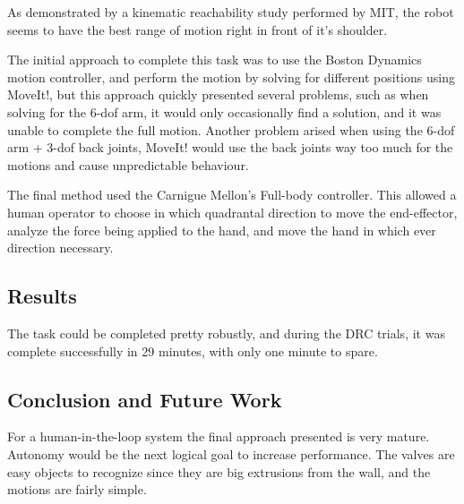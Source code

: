 \documentclass[12pt]{report}
\begin{document}
As demonstrated by a kinematic reachability study performed by MIT, the robot seems to have the best range of motion right in front of it's shoulder. \cite{mitaffordance} 

The initial approach to complete this task was to use the Boston Dynamics motion controller, and perform the motion by solving for different positions using MoveIt!, but this approach quickly presented several problems, such as when solving for the 6-dof arm, it would only occasionally find a solution, and it was unable to complete the full motion. Another problem arised when using the 6-dof arm + 3-dof back joints, MoveIt! would use the back joints way too much for the motions and cause unpredictable behaviour. 

The final method used the Carnigue Mellon's Full-body controller. This allowed a human operator to choose in which quadrantal direction to move the end-effector, analyze the force being applied to the hand, and move the hand in which ever direction necessary. 

\subsection{Results}
The task could be completed pretty robustly, and during the DRC trials, it was complete successfully in 29 minutes, with only one minute to spare. 

\subsection{Conclusion and Future Work}

For a human-in-the-loop system the final approach presented is very mature. Autonomy would be the next logical goal to increase performance. The valves are easy objects to recognize since they are big extrusions from the wall, and the motions are fairly simple. 
\end{document}
